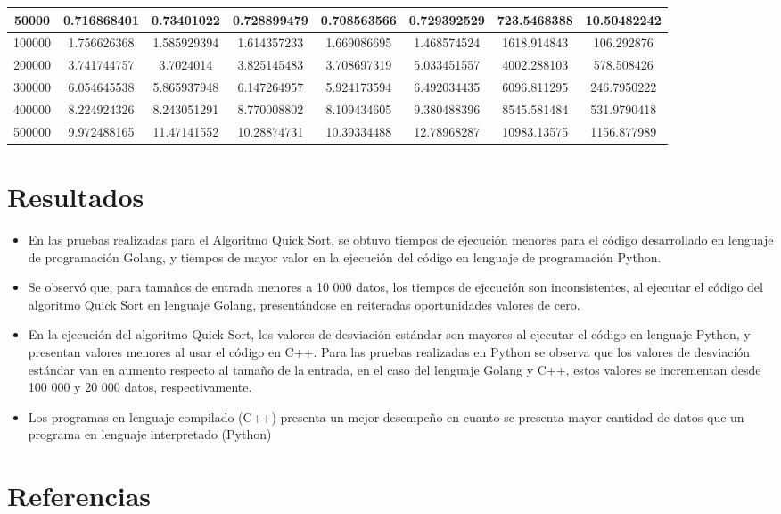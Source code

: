 \documentclass{article}
\begin{document}
\begin{table}[]
\begin{tabular}{|c|c|c|c|c|c|c|c| }
50000	&0.716868401	&0.73401022	&0.728899479	&0.708563566	&0.729392529	&723.5468388	&10.50482242\\ \hline
100000	&1.756626368	&1.585929394	&1.614357233	&1.669086695	&1.468574524	&1618.914843	&106.292876\\ \hline
200000	&3.741744757	&3.7024014	&3.825145483	&3.708697319	&5.033451557	&4002.288103	&578.508426\\ \hline
300000	&6.054645538	&5.865937948	&6.147264957	&5.924173594	&6.492034435	&6096.811295	&246.7950222\\ \hline
400000	&8.224924326	&8.243051291	&8.770008802	&8.109434605	&9.380488396	&8545.581484	&531.9790418\\ \hline
500000	&9.972488165	&11.47141552	&10.28874731	&10.39334488	&12.78968287	&10983.13575	&1156.877989\\ \hline

       \end{tabular}
   \end{table}


   \section{Resultados}
   \begin{itemize}
     \item  En las pruebas realizadas para el Algoritmo Quick Sort, se obtuvo tiempos de ejecución menores para el código desarrollado en lenguaje de programación Golang, y tiempos de mayor valor en la ejecución del código en lenguaje de programación Python.
     \item	Se observó que, para tamaños de entrada menores a 10 000 datos, los tiempos de ejecución son inconsistentes, al ejecutar el código del algoritmo Quick Sort en lenguaje Golang, presentándose en reiteradas oportunidades valores de cero.
     \item	En la ejecución del algoritmo Quick Sort, los valores de desviación estándar son mayores al ejecutar el código en lenguaje Python, y presentan valores menores al usar el código en C++. Para las pruebas realizadas en Python se observa que los valores de desviación estándar van en aumento respecto al tamaño de la entrada, en el caso del lenguaje Golang y C++, estos valores se incrementan desde 100 000 y 20 000 datos, respectivamente.
     \item  Los programas en lenguaje compilado (C++) presenta un mejor desempeño en cuanto se presenta mayor cantidad de datos que un programa en lenguaje interpretado (Python)
   \end{itemize}

   \section{Referencias}
\end{document}
